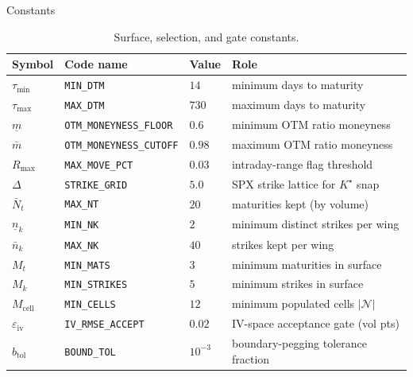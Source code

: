 \documentclass[a4paper, 11pt, reqno]{amsart}
\makeatletter
\def\section{\@startsection{section}{1}%
	\z@{.7\linespacing\@plus\linespacing}{.5\linespacing}%
	{\normalfont\bfseries\centering}}
\newcommand{\ConstMinMaturitySym}{\tau_{\min}}           \newcommand{\ConstMinMaturityVal}{14}
\newcommand{\ConstMaxMaturitySym}{\tau_{\max}}           \newcommand{\ConstMaxMaturityVal}{730}
\newcommand{\ConstOtmFloorSym}{\underline{m}}            \newcommand{\ConstOtmFloorVal}{0.6}
\newcommand{\ConstOtmCutoffSym}{\bar m}                  \newcommand{\ConstOtmCutoffVal}{0.98}
\newcommand{\ConstMaxMoveSym}{R_{\max}}                  \newcommand{\ConstMaxMoveVal}{0.03}
\newcommand{\ConstStrikeGridSym}{\Delta}                 \newcommand{\ConstStrikeGridVal}{5.0}
\newcommand{\ConstMaxMaturitiesSym}{\bar N_t}            \newcommand{\ConstMaxMaturitiesVal}{20}
\newcommand{\ConstMinWingStrikesSym}{\underline{n}_{k}}  \newcommand{\ConstMinWingStrikesVal}{2}
\newcommand{\ConstMaxWingStrikesSym}{\bar{n}_{k}}        \newcommand{\ConstMaxWingStrikesVal}{40}
\newcommand{\ConstMinMatsSym}{M_t}                       \newcommand{\ConstMinMatsVal}{3}
\newcommand{\ConstMinStrikesSym}{M_k}                    \newcommand{\ConstMinStrikesVal}{5}
\newcommand{\ConstMinCellsSym}{M_{\mathrm{cell}}}        \newcommand{\ConstMinCellsVal}{12}
\newcommand{\ConstIvGateSym}{\varepsilon_{\mathrm{iv}}}  \newcommand{\ConstIvGateVal}{0.02}
\newcommand{\ConstBoundTolSym}{b_{\mathrm{tol}}}         \newcommand{\ConstBoundTolVal}{10^{-3}}
\makeatother
\begin{document}
	\section{Constants}\label{sec:constants}
		\begin{table}[H]
		\centering
		\small
		\begin{tabular}{llll}
			\toprule
			\textbf{Symbol} & \textbf{Code name} & \textbf{Value} & \textbf{Role} \\
			\midrule
			$\ConstMinMaturitySym$    & \texttt{MIN\_DTM}               & $\ConstMinMaturityVal$    & minimum days to maturity \\
			$\ConstMaxMaturitySym$    & \texttt{MAX\_DTM}               & $\ConstMaxMaturityVal$    & maximum days to maturity \\
			$\ConstOtmFloorSym$       & \texttt{OTM\_MONEYNESS\_FLOOR}  & $\ConstOtmFloorVal$       & minimum OTM ratio moneyness \\
			$\ConstOtmCutoffSym$      & \texttt{OTM\_MONEYNESS\_CUTOFF} & $\ConstOtmCutoffVal$      & maximum OTM ratio moneyness \\
			$\ConstMaxMoveSym$        & \texttt{MAX\_MOVE\_PCT}         & $\ConstMaxMoveVal$        & intraday-range flag threshold \\
			$\ConstStrikeGridSym$     & \texttt{STRIKE\_GRID}           & $\ConstStrikeGridVal$     & SPX strike lattice for $K^\star$ snap \\
			$\ConstMaxMaturitiesSym$  & \texttt{MAX\_NT}                & $\ConstMaxMaturitiesVal$  & maturities kept (by volume) \\
			$\ConstMinWingStrikesSym$ & \texttt{MIN\_NK}                & $\ConstMinWingStrikesVal$ & minimum distinct strikes per wing \\
			$\ConstMaxWingStrikesSym$ & \texttt{MAX\_NK}                & $\ConstMaxWingStrikesVal$ & strikes kept per wing \\
			$\ConstMinMatsSym$        & \texttt{MIN\_MATS}              & $\ConstMinMatsVal$        & minimum maturities in surface \\
			$\ConstMinStrikesSym$     & \texttt{MIN\_STRIKES}           & $\ConstMinStrikesVal$     & minimum strikes in surface \\
			$\ConstMinCellsSym$       & \texttt{MIN\_CELLS}             & $\ConstMinCellsVal$       & minimum populated cells $|\mathcal{N}|$ \\
			$\ConstIvGateSym$         & \texttt{IV\_RMSE\_ACCEPT}       & $\ConstIvGateVal$         & IV-space acceptance gate (vol pts) \\
			$\ConstBoundTolSym$       & \texttt{BOUND\_TOL}             & $\ConstBoundTolVal$       & boundary-pegging tolerance fraction \\
			\bottomrule
		\end{tabular}
		\vspace*{-0.8em}
		\caption{Surface, selection, and gate constants.}\label{tab:const}
		\end{table}
\end{document}

